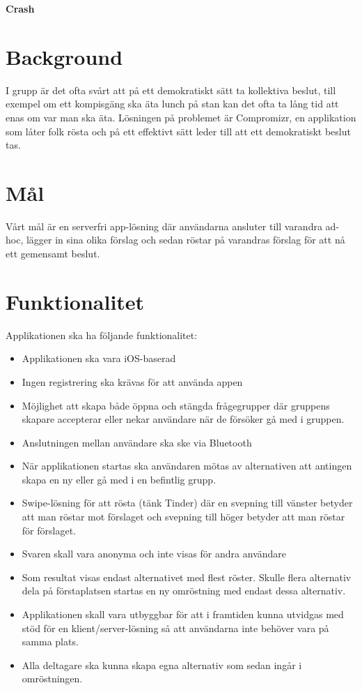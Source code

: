 \documentclass[10pt]{article}
\date{}
\begin{document}

\begin{center}
{\Large
\textbf{Crash}
}
\end{center}




\section*{Background}
\sloppy
\noindent I grupp är det ofta svårt att på ett demokratiskt sätt ta kollektiva beslut, till exempel om ett kompisgäng ska äta lunch på stan kan det ofta ta lång tid att enas om var man ska äta. Lösningen på problemet är Compromizr, en applikation som låter folk rösta och på ett effektivt sätt leder till att ett demokratiskt beslut tas. 

\section*{Mål}
\sloppy
\noindent Vårt mål är en serverfri app-lösning där användarna ansluter till varandra ad-hoc, lägger in sina olika förslag och sedan röstar på varandras förslag för att nå ett gemensamt beslut.

\section*{Funktionalitet}
\sloppy
\noindent Applikationen ska ha följande funktionalitet: 
\begin{itemize}
	\setlength\itemsep{0.1em}
	\item Applikationen ska vara iOS-baserad
	\item Ingen registrering ska krävas för att använda appen
	\item Möjlighet att skapa både öppna och stängda frågegrupper där gruppens skapare accepterar eller nekar användare när de försöker gå med i gruppen.
	\item Anslutningen mellan användare ska ske via Bluetooth
    \item När applikationen startas ska användaren mötas av alternativen att antingen skapa en ny eller gå med i en befintlig grupp.
    \item Swipe-lösning för att rösta (tänk Tinder) där en svepning till vänster betyder att man röstar mot förslaget och svepning till höger betyder att man röstar för förslaget.
    \item Svaren skall vara anonyma och inte visas för andra användare
    \item Som resultat visas endast alternativet med flest röster. Skulle flera alternativ dela på förstaplatsen startas en ny omröstning med endast dessa alternativ. 
    \item Applikationen skall vara utbyggbar för att i framtiden kunna utvidgas med stöd för en klient/server-lösning så att användarna inte behöver vara på samma plats.
    \item Alla deltagare ska kunna skapa egna alternativ som sedan ingår i omröstningen.
\end{itemize}
\end{document}
